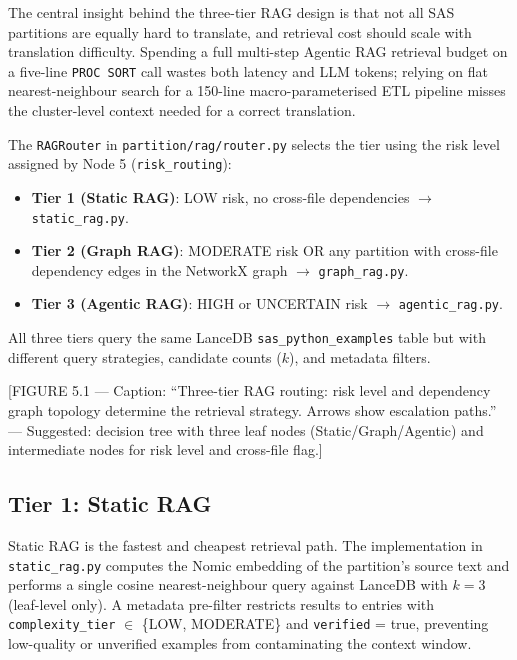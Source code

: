 The central insight behind the three-tier RAG design is that not all SAS
partitions are equally hard to translate, and retrieval cost should scale with
translation difficulty. Spending a full multi-step Agentic RAG retrieval budget
on a five-line \texttt{PROC SORT} call wastes both latency and LLM tokens;
relying on flat nearest-neighbour search for a 150-line macro-parameterised
ETL pipeline misses the cluster-level context needed for a correct translation.

The \texttt{RAGRouter} in \texttt{partition/rag/router.py} selects the tier
using the risk level assigned by Node 5 (\texttt{risk\_routing}):

\begin{itemize}
  \item \textbf{Tier 1 (Static RAG)}: LOW risk, no cross-file dependencies $\to$
    \texttt{static\_rag.py}.
  \item \textbf{Tier 2 (Graph RAG)}: MODERATE risk OR any partition with
    cross-file dependency edges in the NetworkX graph $\to$
    \texttt{graph\_rag.py}.
  \item \textbf{Tier 3 (Agentic RAG)}: HIGH or UNCERTAIN risk $\to$
    \texttt{agentic\_rag.py}.
\end{itemize}

All three tiers query the same LanceDB \texttt{sas\_python\_examples} table
but with different query strategies, candidate counts ($k$), and metadata
filters.

[FIGURE 5.1 --- Caption: ``Three-tier RAG routing: risk level and dependency
graph topology determine the retrieval strategy. Arrows show escalation
paths.'' --- Suggested: decision tree with three leaf nodes (Static/Graph/Agentic)
and intermediate nodes for risk level and cross-file flag.]

\subsection{Tier 1: Static RAG}
\label{subsec:static-rag-impl}

Static RAG is the fastest and cheapest retrieval path. The implementation in
\texttt{static\_rag.py} computes the Nomic embedding of the partition's source
text and performs a single cosine nearest-neighbour query against LanceDB with
$k=3$ (leaf-level only). A metadata pre-filter restricts results to entries with
\texttt{complexity\_tier} $\in$ \{LOW, MODERATE\} and
\texttt{verified} = true, preventing low-quality or unverified examples from
contaminating the context window.

